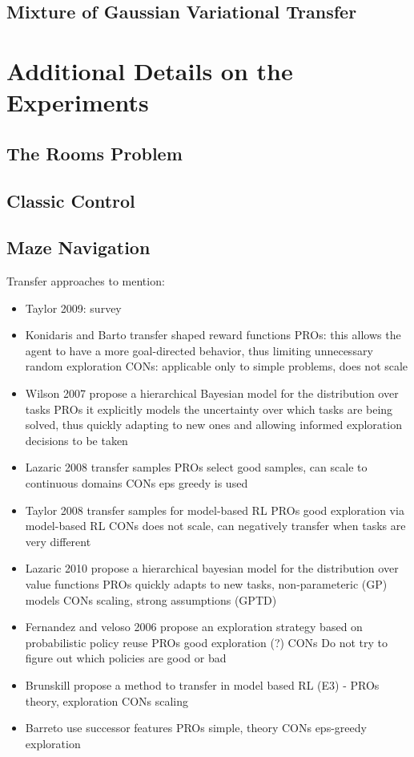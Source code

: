 \documentclass{article}
\begin{document}
\subsection{Mixture of Gaussian Variational Transfer}

\section{Additional Details on the Experiments}

\subsection{The Rooms Problem}

\subsection{Classic Control}

\subsection{Maze Navigation}

Transfer approaches to mention:
\begin{itemize}
\item Taylor 2009: survey
\item Konidaris and Barto transfer shaped reward functions PROs: this allows the agent to have a more goal-directed behavior, thus limiting unnecessary random exploration CONs: applicable only to simple problems, does not scale
\item Wilson 2007 propose a hierarchical Bayesian model for the distribution over tasks PROs it explicitly models the uncertainty over which tasks are being solved, thus quickly adapting to new ones and allowing informed exploration decisions to be taken
\item Lazaric 2008 transfer samples PROs select good samples, can scale to continuous domains CONs eps greedy is used
\item Taylor 2008 transfer samples for model-based RL PROs good exploration via model-based RL CONs does not scale, can negatively transfer when tasks are very different
\item Lazaric 2010 propose a hierarchical bayesian model for the distribution over value functions PROs quickly adapts to new tasks, non-parameteric (GP) models CONs scaling, strong assumptions (GPTD)
\item Fernandez and veloso 2006 propose an exploration strategy based on probabilistic policy reuse PROs good exploration (?) CONs Do not try to figure out which policies are good or bad
\item Brunskill propose a method to transfer in model based RL (E3) - PROs theory, exploration CONs scaling
\item Barreto use successor features PROs simple, theory CONs eps-greedy exploration
\end{itemize}
\end{document}
